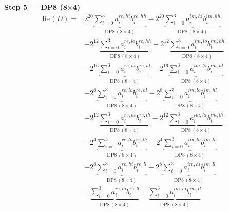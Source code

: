 \documentclass[fleqn]{article}
\newcommand{\DPop}[3]{\mathrm{DP#1}\,(#2\!\times\!#3)}
\begin{document}
\textbf{Step 5 --- DP8 (8$\times$4)}
\begin{align*}
\mathrm{Re}(D) = {}
  & 2^{20}\underbrace{\sum_{i=0}^{3} a_i^{re,hi} b_i^{re,hh}}_{\DPop{8}{8}{4}} - 2^{20}\underbrace{\sum_{i=0}^{3} a_i^{im,hi} b_i^{im,hh}}_{\DPop{8}{8}{4}} \\[0.5em]
  & + 2^{12}\underbrace{\sum_{i=0}^{3} a_i^{re,lo} b_i^{re,hh}}_{\DPop{8}{8}{4}} - 2^{12}\underbrace{\sum_{i=0}^{3} a_i^{im,lo} b_i^{im,hh}}_{\DPop{8}{8}{4}} \\[0.5em]
  & + 2^{16}\underbrace{\sum_{i=0}^{3} a_i^{re,hi} b_i^{re,hl}}_{\DPop{8}{8}{4}} - 2^{16}\underbrace{\sum_{i=0}^{3} a_i^{im,hi} b_i^{im,hl}}_{\DPop{8}{8}{4}} \\[0.5em]
  & + 2^{8}\underbrace{\sum_{i=0}^{3} a_i^{re,lo} b_i^{re,hl}}_{\DPop{8}{8}{4}} - 2^{8}\underbrace{\sum_{i=0}^{3} a_i^{im,lo} b_i^{im,hl}}_{\DPop{8}{8}{4}} \\[0.5em]
  & + 2^{12}\underbrace{\sum_{i=0}^{3} a_i^{re,hi} b_i^{re,lh}}_{\DPop{8}{8}{4}} - 2^{12}\underbrace{\sum_{i=0}^{3} a_i^{im,hi} b_i^{im,lh}}_{\DPop{8}{8}{4}} \\[0.5em]
  & + 2^{4}\underbrace{\sum_{i=0}^{3} a_i^{re,lo} b_i^{re,lh}}_{\DPop{8}{8}{4}} - 2^{4}\underbrace{\sum_{i=0}^{3} a_i^{im,lo} b_i^{im,lh}}_{\DPop{8}{8}{4}} \\[0.5em]
  & + 2^{8}\underbrace{\sum_{i=0}^{3} a_i^{re,hi} b_i^{re,ll}}_{\DPop{8}{8}{4}} - 2^{8}\underbrace{\sum_{i=0}^{3} a_i^{im,hi} b_i^{im,ll}}_{\DPop{8}{8}{4}} \\[0.5em]
  & + \underbrace{\sum_{i=0}^{3} a_i^{re,lo} b_i^{re,ll}}_{\DPop{8}{8}{4}} - \underbrace{\sum_{i=0}^{3} a_i^{im,lo} b_i^{im,ll}}_{\DPop{8}{8}{4}}
\end{align*}
\end{document}
